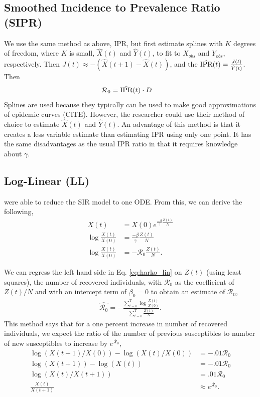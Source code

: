 \documentclass[12pt]{article}
\newcommand{\rr}{\ensuremath{\mathcal{R}_0}}
\begin{document}
\subsection{Smoothed Incidence to Prevalence Ratio (SIPR)}
We use the same method as above, IPR, but first estimate splines with $K$ degrees of freedom, where $K$ is small, $\hat{X}(t)$ and $\hat{Y}(t)$, to fit to $X_{obs}$ and $Y_{obs}$, respectively.  Then  $J(t) \approx -(\hat{X}(t+1) - \hat{X}(t))$, and the $\hat{\textnormal{IPR}}(t) = \frac{J(t)}{\hat{Y}(t)}$.  Then
\begin{align*}
\rr &= \hat{\textnormal{IPR}}(t) \cdot D
\end{align*}
Splines are used because they typically can be used to make good approximations of epidemic curves (CITE).  However, the researcher could use their method of choice to estimate $\hat{X}(t)$ and $\hat{Y}(t)$.  An advantage of this method is that it creates a less variable estimate than estimating IPR using only one point.  It has the same disadvantages as the usual IPR ratio in that it requires knowledge about $\gamma$.

\subsection{Log-Linear (LL)}
\cite{harko2014exact} were able to reduce the SIR model to one ODE.  From this, we can derive the following,
\begin{align}
  X(t) &=  X(0) e^{\frac{-\beta}{\gamma}\frac{Z(t)}{N}} \nonumber\\
  \log \frac{X(t)}{X(0)} &=  \frac{-\beta }{\gamma}\frac{Z(t)}{N} \nonumber\\
  \log \frac{X(t)}{X(0)} &=  -\rr \frac{Z(t)}{N}. \label{eq:harko_lin}
\end{align}

We can regress the left hand side in Eq. \ref{eq:harko_lin} on $Z(t)$ (using least squares), the number of recovered individuals, with $\rr$ as the coefficient of $Z(t)/N$ and with an intercept term of $\beta_0=0$ to obtain an estimate of $\rr$,
\begin{align*}
  \hat{\rr} = -\frac{\sum_{t=0}^T \log \frac{ X(t)}{X(0)}}{\sum_{t=0}^T\frac{Z(t)}{N}}.
\end{align*}
This method says that for a one percent increase in number of recovered individuals, we expect the ratio of the number of previous susceptibles to number of new susceptibles to increase by $e^{\rr}$,
\begin{align*}
  \log \left ( X(t+1)/ X(0) \right ) - \log \left ( X(t)/X(0) \right ) &= - .01\rr\\
  \log \left ( X(t+1) \right ) - \log \left ( X(t) \right )  &=- .01\rr\\
  \log \left ( X(t) / X(t+1) \right ) &= .01\rr\\
  \frac{X(t)}{X(t+1)}  &\approx e^{\rr}.
\end{align*}
\end{document}
